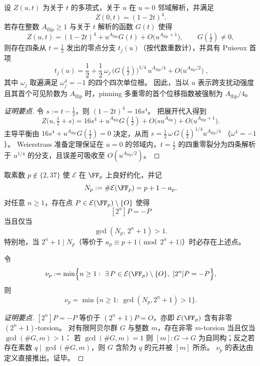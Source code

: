 \begin{conclusion}\label{con:xi-terminal-zm-holonomy-pinning-puiseux-splitting}
设 \(Z(u,t)\) 为关于 \(t\) 的多项式，关于 \(u\) 在 \(u=0\) 邻域解析，并满足
\[
Z(0,t)=(1-2t)^4.
\]
若存在整数 \(A_{\mathrm{flip}}\ge 1\) 与关于 \(t\) 解析的函数 \(G(t)\) 使得
\[
Z(u,t)=(1-2t)^4+u^{A_{\mathrm{flip}}}G(t)+O\bigl(u^{A_{\mathrm{flip}}+1}\bigr),
\qquad
G(\tfrac12)\neq 0,
\]
则存在四条从 \(t=\tfrac12\) 发出的零点分支 \(t_j(u)\)（按代数重数计），并具有 Puiseux 首项
\[
\boxed{\;
t_j(u)=\frac12+\frac12\,\omega_j\,\bigl(G(\tfrac12)\bigr)^{1/4}\,u^{A_{\mathrm{flip}}/4}
+O\bigl(u^{A_{\mathrm{flip}}/2}\bigr)\; },
\]
其中 \(\omega_j\) 取遍满足 \(\omega_j^4=-1\) 的四个四次单位根。
因此，当以 \(u\) 表示跨支扰动强度且其首个可见阶数为 \(A_{\mathrm{flip}}\) 时，pinning 多重零的首个位移指数被强制为 \(A_{\mathrm{flip}}/4\)。
\end{conclusion}
\begin{proof}[证明要点]
令 \(s:=t-\tfrac12\)，则 \((1-2t)^4=16s^4\)。
把展开代入得到
\[
Z\bigl(u,\tfrac12+s\bigr)=16s^4+u^{A_{\mathrm{flip}}}G(\tfrac12)+O\bigl(su^{A_{\mathrm{flip}}}\bigr)+O\bigl(u^{A_{\mathrm{flip}}+1}\bigr).
\]
主导平衡由 \(16s^4+u^{A_{\mathrm{flip}}}G(\tfrac12)=0\) 决定，从而
\(
s=\tfrac12\,\omega\,G(\tfrac12)^{1/4}u^{A_{\mathrm{flip}}/4}
\)
（\(\omega^4=-1\)）。
Weierstrass 准备定理保证在 \(u=0\) 的邻域内，\(t=\tfrac12\) 的四重零裂分为四条解析于 \(u^{1/4}\) 的分支，且误差可吸收至 \(O(u^{A_{\mathrm{flip}}/2})\)。
\end{proof}

\begin{conclusion}\label{con:xi-terminal-zm-lattes-minus-holonomy-modp-gcd}
取素数 \(p\notin\{2,37\}\) 使 \(\mathcal{E}\) 在 \(\FF_p\) 上良好约化，并记
\[
N_p:=\#\mathcal{E}(\FF_p)=p+1-a_p.
\]
对任意 \(n\ge 1\)，存在点 \(P\in\mathcal{E}(\FF_p)\setminus\{O\}\) 使得
\[
[2^{n}]P=-P
\]
当且仅当
\[
\gcd(N_p,\,2^{n}+1)>1.
\]
特别地，当 \(2^{n}+1\mid N_p\)（等价于 \(a_p\equiv p+1\pmod{2^{n}+1}\)）时必存在上述点。
\par
令
\[
\nu_p:=\min\Bigl\{n\ge 1:\ \exists\,P\in\mathcal{E}(\FF_p)\setminus\{O\},\ [2^{n}]P=-P\Bigr\},
\]
则
\[
\nu_p=\min\bigl\{n\ge 1:\ \gcd(N_p,2^{n}+1)>1\bigr\}.
\]
\end{conclusion}
\begin{proof}[证明要点]
\([2^{n}]P=-P\) 等价于 \((2^{n}+1)P=O\)，亦即 \(\mathcal{E}(\FF_p)\) 含有非零 \((2^{n}+1)\)-torsion。
对有限阿贝尔群 \(G\) 与整数 \(m\)，存在非零 \(m\)-torsion 当且仅当 \(\gcd(\#G,m)>1\)：
若 \(\gcd(\#G,m)=1\) 则 \([m]:G\to G\) 为自同构；反之若存在素数 \(q\mid\gcd(\#G,m)\)，则 \(G\) 含阶为 \(q\) 的元并被 \([m]\) 所杀。
\(\nu_p\) 的表达由定义直接推出。证毕。
\end{proof}

